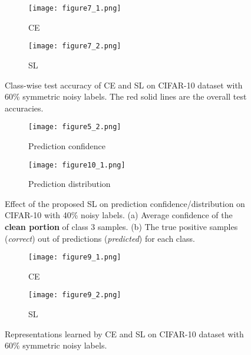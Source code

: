 \documentclass[10pt,twocolumn,letterpaper]{article}
\begin{document}
\begin{figure}[!t]
	\centering
	\begin{subfigure}{0.49\linewidth}
		\texttt{[image: figure7\_1.png]}
		\caption{CE}
		\label{ce_test_acc}
	\end{subfigure}
	\begin{subfigure}{0.49\linewidth} 
		\texttt{[image: figure7\_2.png]}
		\caption{SL} 
		\label{sce_test_acc}
	\end{subfigure}
	\vspace{-0.1 in}
	\caption{Class-wise test accuracy of CE and SL on CIFAR-10 dataset with 60\% symmetric noisy labels. The red solid lines are the overall test accuracies.}
	\label{fig:ce_sce_test_acc_60}
	\vspace{-0.1 in}
\end{figure}


\begin{figure}[!t]
	\centering
	\begin{subfigure}{0.49\linewidth}
		\texttt{[image: figure5\_2.png]}
		\caption{Prediction confidence}
		\label{sce_confidence}
	\end{subfigure}
	\begin{subfigure}{0.49\linewidth}
		\texttt{[image: figure10\_1.png]}
		\caption{Prediction distribution} 
		\label{sce_prediction}
	\end{subfigure}
	\vspace{-0.1 in}
	\caption{Effect of the proposed SL on prediction confidence/distribution on CIFAR-10 with 40\% noisy labels. (a) Average confidence of the \textbf{clean portion} of class 3 samples. (b) The true positive samples (\emph{correct}) out of predictions (\emph{predicted}) for each class.}
	\label{fig:ce_sce_learning}
	\vspace{-0.1 in}
\end{figure}

\begin{figure}[!t]
	\centering
	\begin{subfigure}{0.49\linewidth}
		\texttt{[image: figure9\_1.png]}
		\caption{CE}
\end{subfigure}
	\begin{subfigure}{0.49\linewidth} 
		\texttt{[image: figure9\_2.png]}
		\caption{SL} 
\end{subfigure}
	\vspace{-0.1 in}
	\caption{Representations learned by CE and SL on CIFAR-10 dataset with 60\% symmetric noisy labels.}
	\label{fig:rep_ce_sce_60}
	\vspace{-0.15 in}
\end{figure}
\end{document}
